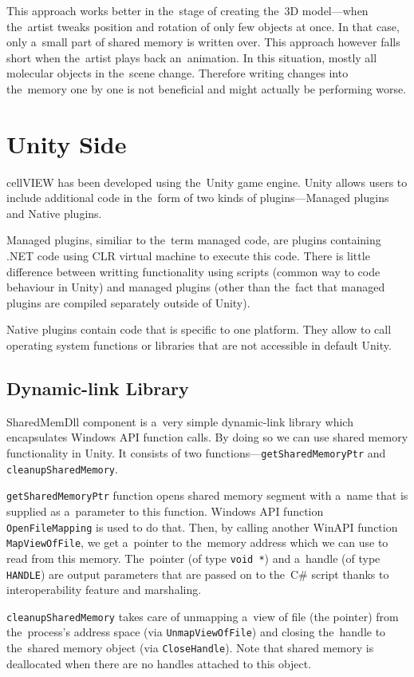 \documentclass[
  digital, %
  table,   %
  nolof,     %
  nolot,     %
  oneside,
]{fithesis3}
\begin{document}
This approach works better in the stage of creating the 3D model—when the artist tweaks position and rotation of only few objects at once. In that case, only a small part of shared memory is written over. This approach however falls short when the artist plays back an animation. In this situation, mostly all molecular objects in the scene change. Therefore writing changes into the memory one by one is not beneficial and might actually be performing worse.

\section{Unity Side}
cellVIEW has been developed using the Unity game engine. Unity allows users to include additional code in the form of two kinds of plugins—Managed plugins and Native plugins.

Managed plugins, similiar to the term managed code, are plugins containing .NET code using CLR virtual machine to execute this code. There is little difference between writting functionality using scripts (common way to code behaviour in Unity) and managed plugins (other than the fact that managed plugins are compiled separately outside of Unity).

Native plugins contain code that is specific to one platform. They allow to call operating system functions or libraries that are not accessible in default Unity.

\subsection{Dynamic-link Library}
SharedMemDll component is a very simple dynamic-link library which encapsulates Windows API function calls. By doing so we can use shared memory functionality in Unity. It consists of two functions—\texttt{get\-Shared\-Memory\-Ptr} and \texttt{cleanup\-Shared\-Memory}.

\texttt{getSharedMemoryPtr} function opens shared memory segment with a name that is supplied as a parameter to this function. Windows API function \texttt{OpenFileMapping} is used to do that. Then, by calling another WinAPI function \texttt{MapViewOfFile}, we get a pointer to the memory address which we can use to read from this memory. The pointer (of type \texttt{void *}) and a handle (of type \texttt{HANDLE}) are output parameters that are passed on to the C\# script thanks to interoperability feature and marshaling.

\texttt{cleanupSharedMemory} takes care of unmapping a view of file (the pointer) from the process's address space (via \texttt{UnmapViewOfFile}) and closing the handle to the shared memory object (via \texttt{CloseHandle}). Note that shared memory is deallocated when there are no handles attached to this object.
\end{document}
